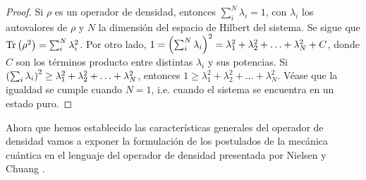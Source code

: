 \begin{proof}
	Si $\rho$ es un operador de densidad, entonces $\sum_i^N \lambda_i=1$, 
	con $\lambda_i$ los autovalores de $\rho$ y $N$ la dimensión 
	del espacio de Hilbert del sistema. Se sigue que 
	$\Tr \qty(\rho^2) = \sum_i^N \lambda_i^2$. Por otro lado, 
	$1=\qty(\sum_i^N \lambda_i)^2=\lambda_1^2+\lambda_2^2+\ldots+\lambda_N^2+C$,
	donde $C$ son los términos producto entre distintas $\lambda_i$ y sus
	potencias. Si 
	$\qty(\sum_i \lambda_i)^2\geq\lambda_1^2+\lambda_2^2+\ldots+\lambda_N^2$,
	entonces
	$1\geq\lambda_1^2+\lambda_2^2+\ldots+\lambda_N^2$. Véase que 
	la igualdad se cumple cuando $N=1$, i.e. cuando el sistema 
	se encuentra en un estado puro. 
\end{proof}

Ahora que hemos establecido las características generales del 
operador de densidad vamos a exponer la formulación
de  los postulados de la mecánica cuántica en el lenguaje del 
operador de densidad presentada por 
Nielsen y Chuang \cite{nielsen_chuang_2011}.
